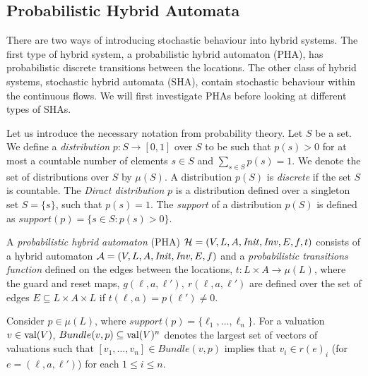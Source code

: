 \subsection{Probabilistic Hybrid Automata}
There are two ways of introducing stochastic behaviour into hybrid systems. The first type of hybrid system, a probabilistic hybrid automaton (PHA), has probabilistic discrete transitions between the locations. The other class of hybrid systems, stochastic hybrid automata (SHA), contain stochastic behaviour within the continuous flows. We will first investigate PHAs before looking at different types of SHAs.

Let us introduce the necessary notation from probability theory.
Let $S$ be a set. We define a \emph{distribution} $p: S\rightarrow [0,1]$ over $S$ to be such that $p(s)>0$ for at most a countable number of elements $s\in S$ and $\sum_{s\in S}p(s)=1$. We denote the set of distributions over $S$ by $\mu(S)$.
A distribution $p(S)$ is \emph{discrete} if the set $S$ is countable.
The \emph{Diract distribution} $p$ is a distribution defined over a singleton set $S=\{s\}$, such that $p(s)=1$.
The \emph{support} of a distribution $p(S)$ is defined as $support(p)=\{s\in S : p(s) >0\}$.

\begin{defi}
A \emph{probabilistic hybrid automaton} (PHA) $\mathcal{H} = (V,L,A,\mathit{Init},\mathit{Inv},E,f,t)$ consists of a hybrid automaton $\mathcal{A}=(V,L,A,\mathit{Init},\mathit{Inv},E,f)$ and a \emph{probabilistic transitions function} defined on the edges between the locations, $t : L\times A \rightarrow \mu(L)$, where the guard and reset maps, $g(\ell,a,\ell'),\ r(\ell,a,\ell')$  are defined over the set of edges $E \subseteq L \times A \times L$ if $t(\ell,a)=p(\ell')\neq 0$.
\end{defi}

Consider $p\in\mu(L)$, where $support(p)=\{\ell_{1},\ldots,\ell_{n}\}$. For a valuation $v\in\operatorname{val}(V)$, $Bundle(v,p)\subseteq \operatorname{val}(V)^n$ denotes the largest set of vectors of valuations such that $[v_{1},\ldots,v_{n}]\in Bundle(v,p)$ implies that $v_{i}\in r(e)_{i}$ (for $e=(\ell,a,\ell')$) for each $1\leq i\leq n$.

